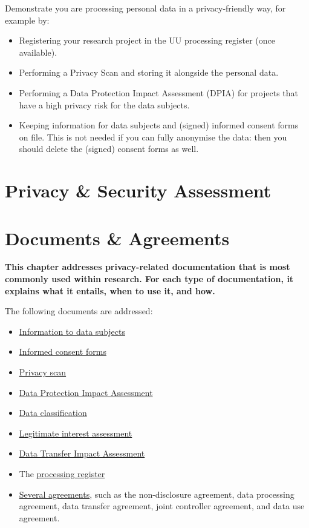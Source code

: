 \documentclass[
]{book}
\providecommand{\tightlist}{%
  \setlength{\itemsep}{0pt}\setlength{\parskip}{0pt}}
\begin{document}
Demonstrate you are processing personal data in a privacy-friendly way, for
example by:

\begin{itemize}
\tightlist
\item
  Registering your research project in the UU processing register (once available).
\item
  Performing a Privacy Scan and storing it
  alongside the personal data.
\item
  Performing a Data Protection Impact Assessment (DPIA) for
  projects that have a high privacy risk for the data subjects.
\item
  Keeping information for data subjects and (signed) informed consent forms on
  file. This is not needed if you can fully anonymise the data: then you should
  delete the (signed) consent forms as well.
\end{itemize}

\hypertarget{risk-assessment}{%
\chapter{Privacy \& Security Assessment}\label{risk-assessment}}

\hypertarget{legal-documents}{%
\chapter{Documents \& Agreements}\label{legal-documents}}

\textbf{This chapter addresses privacy-related documentation that is most commonly used
within research. For each type of documentation, it explains what it entails,
when to use it, and how.}

The following documents are addressed:

\begin{itemize}
\tightlist
\item
  \protect\hyperlink{privacy-notices}{Information to data subjects}
\item
  \protect\hyperlink{informed-consent-forms}{Informed consent forms}
\item
  \protect\hyperlink{privacy-scan}{Privacy scan}
\item
  \protect\hyperlink{dpia}{Data Protection Impact Assessment}
\item
  \protect\hyperlink{data-classification}{Data classification}
\item
  \protect\hyperlink{legitimate-interest-assessment}{Legitimate interest assessment}
\item
  \protect\hyperlink{dtia}{Data Transfer Impact Assessment}
\item
  The \protect\hyperlink{processing-register}{processing register}
\item
  \protect\hyperlink{agreements}{Several agreements}, such as the non-disclosure agreement, data processing
  agreement, data transfer agreement, joint controller agreement, and data use
  agreement.
\end{itemize}
\end{document}
